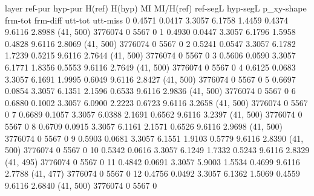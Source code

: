 layer     ref-pur    hyp-pur    H(ref)    H(hyp)      MI    MI/H(ref)    ref-segL    hyp-segL  p_xy-shape      frm-tot    frm-diff    utt-tot    utt-miss
0          0.4571     0.0417    3.3057    6.1758  1.4459       0.4374      9.6116      2.8988  (41, 500)       3776074           0       5567           0
1          0.4930     0.0447    3.3057    6.1796  1.5958       0.4828      9.6116      2.8069  (41, 500)       3776074           0       5567           0
2          0.5241     0.0547    3.3057    6.1782  1.7239       0.5215      9.6116      2.7644  (41, 500)       3776074           0       5567           0
3          0.5606     0.0590    3.3057    6.1771  1.8356       0.5553      9.6116      2.7649  (41, 500)       3776074           0       5567           0
4          0.6125     0.0683    3.3057    6.1691  1.9995       0.6049      9.6116      2.8427  (41, 500)       3776074           0       5567           0
5          0.6697     0.0854    3.3057    6.1351  2.1596       0.6533      9.6116      2.9836  (41, 500)       3776074           0       5567           0
6          0.6880     0.1002    3.3057    6.0900  2.2223       0.6723      9.6116      3.2658  (41, 500)       3776074           0       5567           0
7          0.6689     0.1057    3.3057    6.0388  2.1691       0.6562      9.6116      3.2397  (41, 500)       3776074           0       5567           0
8          0.6709     0.0915    3.3057    6.1161  2.1571       0.6526      9.6116      2.9698  (41, 500)       3776074           0       5567           0
9          0.5903     0.0681    3.3057    6.1551  1.9103       0.5779      9.6116      2.8390  (41, 500)       3776074           0       5567           0
10         0.5342     0.0616    3.3057    6.1249  1.7332       0.5243      9.6116      2.8329  (41, 495)       3776074           0       5567           0
11         0.4842     0.0691    3.3057    5.9003  1.5534       0.4699      9.6116      2.7788  (41, 477)       3776074           0       5567           0
12         0.4756     0.0492    3.3057    6.1362  1.5069       0.4559      9.6116      2.6840  (41, 500)       3776074           0       5567           0
   